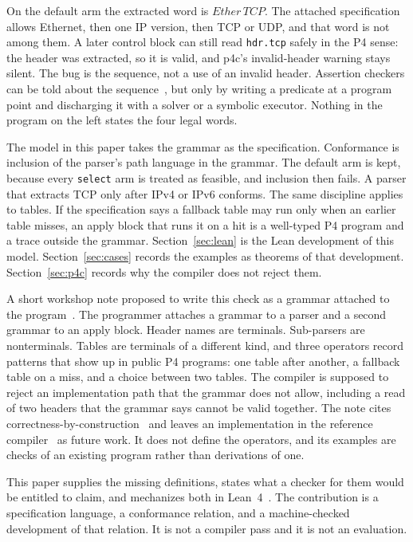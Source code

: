 \documentclass[a4paper,UKenglish,cleveref,autoref]{lipics-v2021}
\begin{document}
\smallskip
\noindent
On the default arm the extracted word is \(\mathit{Ether}\,\mathit{TCP}\).
The attached specification allows Ethernet, then one IP version, then TCP or UDP, and that word is not among them.
A later control block can still read \texttt{hdr.tcp} safely in the P4 sense: the header was extracted, so it is valid, and p4c's invalid-header warning stays silent.
The bug is the sequence, not a use of an invalid header.
Assertion checkers can be told about the sequence~\cite{p4v,vera,assertp4}, but only by writing a predicate at a program point and discharging it with a solver or a symbolic executor.
Nothing in the program on the left states the four legal words.

The model in this paper takes the grammar as the specification.
Conformance is inclusion of the parser's path language in the grammar.
The default arm is kept, because every \texttt{select} arm is treated as feasible, and inclusion then fails.
A parser that extracts TCP only after IPv4 or IPv6 conforms.
The same discipline applies to tables.
If the specification says a fallback table may run only when an earlier table misses, an apply block that runs it on a hit is a well-typed P4 program and a trace outside the grammar.
Section~\ref{sec:lean} is the Lean development of this model.
Section~\ref{sec:cases} records the examples as theorems of that development.
Section~\ref{sec:p4c} records why the compiler does not reject them.

A short workshop note proposed to write this check as a grammar attached to the program~\cite{yuan2025fmano}.
The programmer attaches a grammar to a parser and a second grammar to an apply block.
Header names are terminals.
Sub-parsers are nonterminals.
Tables are terminals of a different kind, and three operators record patterns that show up in public P4 programs: one table after another, a fallback table on a miss, and a choice between two tables.
The compiler is supposed to reject an implementation path that the grammar does not allow, including a read of two headers that the grammar says cannot be valid together.
The note cites correctness-by-construction~\cite{dijkstra1976,morgan1994,kourie2012} and leaves an implementation in the reference compiler~\cite{p4c} as future work.
It does not define the operators, and its examples are checks of an existing program rather than derivations of one.

This paper supplies the missing definitions, states what a checker for them would be entitled to claim, and mechanizes both in Lean~4~\cite{lean4}.
The contribution is a specification language, a conformance relation, and a machine-checked development of that relation.
It is not a compiler pass and it is not an evaluation.
\end{document}
